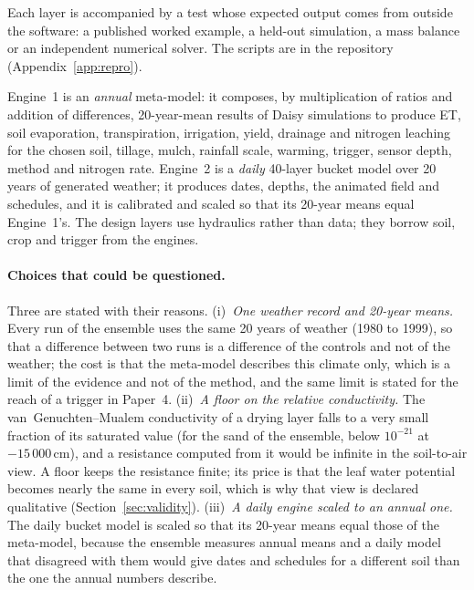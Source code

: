 Each layer is accompanied by a test whose expected output comes from outside the software: a published worked example, a held-out simulation, a mass balance or an independent numerical solver. The scripts are in the repository (Appendix~\ref{app:repro}).

Engine~1 is an \emph{annual} meta-model: it composes, by multiplication of ratios and addition of differences, 20-year-mean results of Daisy simulations to produce ET, soil evaporation, transpiration, irrigation, yield, drainage and nitrogen leaching for the chosen soil, tillage, mulch, rainfall scale, warming, trigger, sensor depth, method and nitrogen rate. Engine~2 is a \emph{daily} 40-layer bucket model over 20 years of generated weather; it produces dates, depths, the animated field and schedules, and it is calibrated and scaled so that its 20-year means equal Engine~1's. The design layers use hydraulics rather than data; they borrow soil, crop and trigger from the engines.

\paragraph{Choices that could be questioned.} Three are stated with their reasons. (i)~\emph{One weather record and 20-year means.} Every run of the ensemble uses the same 20 years of weather (1980 to 1999), so that a difference between two runs is a difference of the controls and not of the weather; the cost is that the meta-model describes this climate only, which is a limit of the evidence and not of the method, and the same limit is stated for the reach of a trigger in Paper~4. (ii)~\emph{A floor on the relative conductivity.} The van~Genuchten--Mualem conductivity of a drying layer falls to a very small fraction of its saturated value (for the sand of the ensemble, below $10^{-21}$ at $-15\,000$\,cm), and a resistance computed from it would be infinite in the soil-to-air view. A floor keeps the resistance finite; its price is that the leaf water potential becomes nearly the same in every soil, which is why that view is declared qualitative (Section~\ref{sec:validity}). (iii)~\emph{A daily engine scaled to an annual one.} The daily bucket model is scaled so that its 20-year means equal those of the meta-model, because the ensemble measures annual means and a daily model that disagreed with them would give dates and schedules for a different soil than the one the annual numbers describe.



